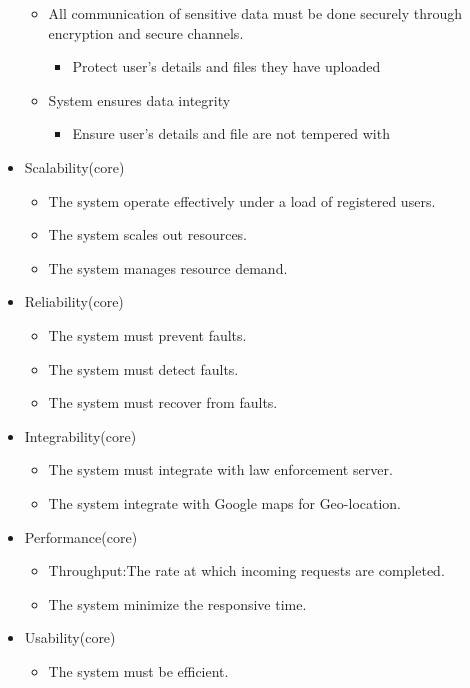 \documentclass[a4paper,12pt]{article}
\begin{document}
\begin{itemize}
\begin{itemize}
\begin{itemize}
			\end{itemize}
		\item All communication of sensitive data must be done securely through
			encryption and secure channels.
				\begin{itemize}
				\item Protect user's details and files they have uploaded
			\end{itemize}
		\item System ensures data integrity
				\begin{itemize}
				\item Ensure user's details and file are not tempered with 
			\end{itemize}
	\end{itemize}
	\item Scalability(core)
	\begin{itemize}
		\item The system operate effectively under a load of registered users.
		\item The system scales out resources.
		\item The system manages resource demand.
	\end{itemize}
	\item Reliability(core)
		\begin{itemize}
			\item The system must prevent faults.
			\item The system must detect faults.
			\item The system must recover from faults.
		\end{itemize}
	\item Integrability(core)
		\begin{itemize}
			\item The system must integrate with law enforcement server.
			\item The system integrate with Google maps for Geo-location.
		\end{itemize}
	\item Performance(core)
		\begin{itemize}
			\item Throughput:The rate at which incoming requests are completed.
			\item The system minimize the responsive time.
		\end{itemize}
	\item Usability(core)
		\begin{itemize}
			\item The system must be efficient.

\end{itemize}
\end{itemize}
\end{document}
